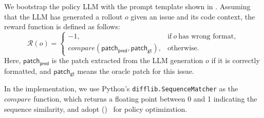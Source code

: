{
\newcommand\seed{\mathcal D_\mathsf{seed}}
\newcommand\formprompt{\mathsf{form\mbox{-}prompt}}
\newcommand\question{q}
\newcommand\issue{\mathsf{issue}}
\newcommand\context{\mathsf{ctx}}
\newcommand\predpatch{\mathsf{patch_{pred}}}
\newcommand\oracle{\mathsf{patch_{gt}}}
\newcommand\prob[1]{\mathbf P(#1)}
\newcommand\oldpolicy{\mathit{\pi_{\theta_{\mathrm{old}}}}}
\newcommand\policy{\mathit{\pi_{\theta}}}
\newcommand\refpolicy{\mathit{\pi_{\mathrm{ref}}}}
\newcommand\ratio{\frac {\policy(o_i \mid \question)} {\oldpolicy(o_i \mid \question)}}
\newcommand\clip{\mathrm{clip}}
\newcommand\kldiv{D_{\mathrm{KL}}}
We bootstrap the policy LLM with the prompt template shown in .
Assuming that the LLM has generated a rollout $o$ given an issue and its code context,
the reward function is defined as follows:
\begin{equation}
\mathcal R(o) = \begin{cases}
    -1, & \text{if}\ o\ \text{has wrong format},\\
    \mathit{compare}(\predpatch, \oracle), & \text{otherwise}.
\end{cases}
\label{eq:reward}
\end{equation}
Here, $\predpatch$ is the patch extracted from the LLM generation $o$ if it is correctly formatted, and $\oracle$ means the oracle patch for this issue.

In the implementation, we use Python's \texttt{difflib.SequenceMatcher} as the $\mathit{compare}$ function, which returns a floating point between 0 and 1 indicating the sequence similarity, and adopt \grpofull (\grpo)~\cite{deepseekmath} for policy optimization.

}
